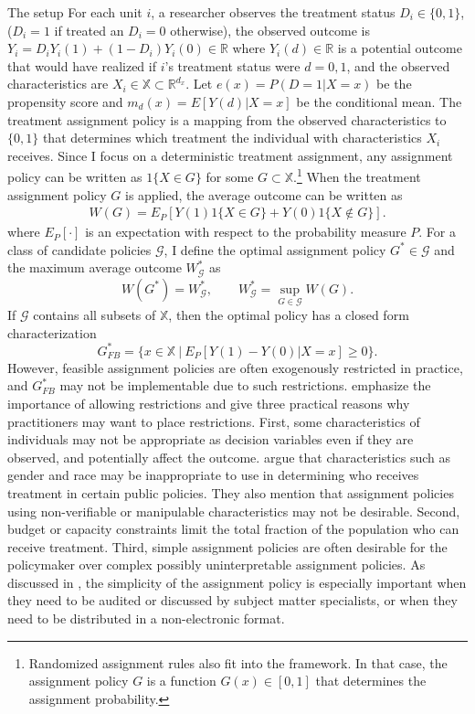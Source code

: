 \documentclass[12pt,oneside,reqno,english]{amsart}
\makeatletter
\renewcommand\subsection{\@startsection{subsection}{2}%
  \z@{-.5\linespacing\@plus-.7\linespacing}{.5\linespacing}%
  {\normalfont\scshape}}
\theoremstyle{definition}
\makeatother
\begin{document}
\subsection{The setup}
For each unit $i$, a researcher observes 
the treatment status $D_{i}\in \{0,1\}$, ($D_{i}=1$ if treated an $D_{i}=0$ otherwise),  the observed outcome is $Y_{i}=D_{i}Y_{i}(1)+(1-D_{i})Y_{i}(0)\in \mathbb{R}$ where $Y_{i}(d)\in \mathbb{R}$ is a potential outcome that would have realized if $i$'s treatment status were $d = 0,1$, and the observed characteristics are $X_{i}\in \mathbb{X}\subset \mathbb{R}^{d_{x}}$. Let $e(x)=P(D=1|X=x)$ be the propensity score and $m_{d}(x)=E[Y(d)|X=x]$ be the conditional mean. 
The treatment assignment policy is a mapping from the observed characteristics to $\{0,1\}$ that determines which treatment the individual with characteristics $X_{i}$ 
receives. Since I focus on a deterministic treatment assignment, any assignment policy can be written as $1\{X\in G\}$ for some $G\subset \mathbb{X}$.\footnote{Randomized assignment rules also fit into the framework. In that case, the assignment policy $G$ is a function $G(x)\in [0,1]$ that determines the assignment probability.}
When the treatment assignment policy $G$ is applied, the average outcome can be written as
\begin{align}
W(G)=E_{P}[Y(1)1\{X\in G\}+Y(0)1\{X\not\in G\}].\label{eq:averageoutcom}
\end{align}
where $E_{P}[\cdot]$ is an expectation with respect to the probability measure $P$.
For a class of candidate policies $\mathcal{G}$, I define the optimal assignment policy $G^{*}\in \mathcal{G}$ and 
the maximum average outcome $W^{*}_{\mathcal{G}}$ as
\[W(G^{*})=W^{*}_{\mathcal{G}},\qquad W^{*}_{\mathcal{G}}=\sup_{G\in \mathcal{G}}W(G).\]
If $\mathcal{G}$ contains all subsets of $\mathbb{X}$, then the optimal policy has a closed form characterization 
\[G^{*}_{FB}=\{x\in \mathbb{X}\ | \ E_{P}[Y(1)-Y(0)|X=x]\geq 0\}.\]
However, feasible assignment policies are often exogenously restricted in practice, and $G^{*}_{FB}$ may not be implementable due to such restrictions. 
\cite{KT:18} emphasize the importance of allowing restrictions and
 give three practical reasons why practitioners may want to place restrictions. 
First, some characteristics of individuals may not be appropriate as decision variables even if they are observed, and potentially affect the outcome. 
\cite{KT:18} argue that characteristics such as gender and race may be inappropriate to use in determining who receives treatment 
in certain public policies. They also mention that assignment policies using non-verifiable or manipulable characteristics may not be desirable.
Second, budget or capacity constraints limit the total fraction of the population who can receive treatment.
Third, simple assignment policies are often desirable for the policymaker over complex possibly uninterpretable assignment policies. 
As discussed in \cite{AW:17}, the simplicity of the assignment policy is especially important when they need to be audited or discussed by subject matter specialists, or when they need to be distributed in a non-electronic format.
\end{document}
